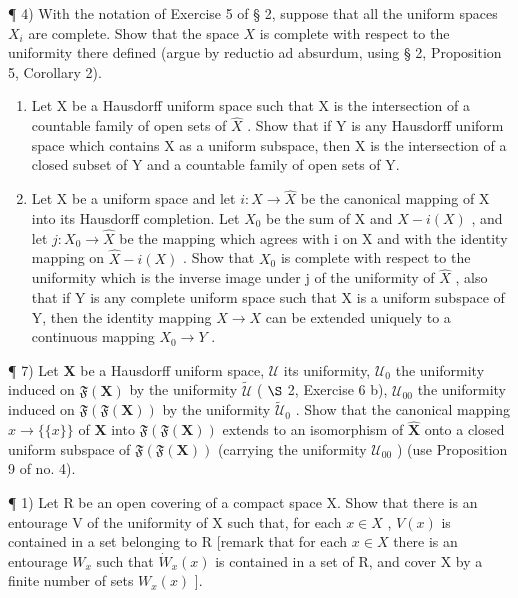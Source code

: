 ¶ 4) With the notation of Exercise 5 of § 2, suppose that all the uniform spaces \(X_i\) are complete. Show that the space \(X\) is complete with respect to the uniformity there defined (argue by reductio ad absurdum, using § 2, Proposition 5, Corollary 2).

\begin{enumerate}
\def\labelenumi{\arabic{enumi})}
\setcounter{enumi}{4}
\item
  Let X be a Hausdorff uniform space such that X is the intersection of a countable family of open sets of \(\hat{X}\) . Show that if Y is any Hausdorff uniform space which contains X as a uniform subspace, then X is the intersection of a closed subset of Y and a countable family of open sets of Y.
\item
  Let X be a uniform space and let \(i: X \to \hat{X}\) be the canonical mapping of X into its Hausdorff completion. Let \(X_{0}\) be the sum of X and \(\hat{X} - i(X)\) , and let \(j: X_{0} \to \hat{X}\) be the mapping which agrees with i on X and with the identity mapping on \(\hat{X} - i(X)\) . Show that \(X_{0}\) is complete with respect to the uniformity which is the inverse image under j of the uniformity of \(\hat{X}\) , also that if Y is any complete uniform space such that X is a uniform subspace of Y, then the identity mapping \(X \to X\) can be extended uniquely to a continuous mapping \(X_{0} \to Y\) .
\end{enumerate}

¶ 7) Let \(\mathbf{X}\) be a Hausdorff uniform space, \(\mathcal{U}\) its uniformity, \(\mathcal{U}_0\) the uniformity induced on \(\mathfrak{F}(\mathbf{X})\) by the uniformity \(\tilde{\mathcal{U}}\) ( \(\S\) 2, Exercise 6 b), \(\mathcal{U}_{00}\) the uniformity induced on \(\mathfrak{F}(\mathfrak{F}(\mathbf{X}))\) by the uniformity \(\tilde{\mathcal{U}}_0\) . Show that the canonical mapping \(x \to \{\{x\}\}\) of \(\mathbf{X}\) into \(\mathfrak{F}(\mathfrak{F}(\mathbf{X}))\) extends to an isomorphism of \(\hat{\mathbf{X}}\) onto a closed uniform subspace of \(\mathfrak{F}(\mathfrak{F}(\mathbf{X}))\) (carrying the uniformity \(\mathcal{U}_{00}\) ) (use Proposition 9 of no. 4).

\BourbakiExerciseGroup

¶ 1) Let R be an open covering of a compact space X. Show that there is an entourage V of the uniformity of X such that, for each \(x \in X\) , \(V(x)\) is contained in a set belonging to R {[}remark that for each \(x \in X\) there is an entourage \(W_x\) such that \(\dot{W}_x(x)\) is contained in a set of R, and cover X by a finite number of sets \(W_x(x)\) {]}.

